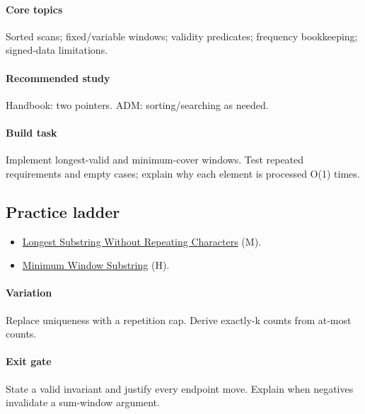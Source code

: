 \documentclass[11pt,letterpaper]{article}
\begin{document}
\paragraph*{Core topics}

Sorted scans; fixed/variable windows; validity predicates; frequency bookkeeping; signed-data limitations.

\paragraph*{Recommended study}

Handbook: two pointers. ADM: sorting/searching as needed.

\paragraph*{Build task}

Implement longest-valid and minimum-cover windows. Test repeated requirements and empty cases; explain why each element is processed O(1) times.

\subsection*{Practice ladder}

\begin{itemize}

\item \href{https://leetcode.com/problems/longest-substring-without-repeating-characters/}{Longest Substring Without Repeating Characters} (M).

\item \href{https://leetcode.com/problems/minimum-window-substring/}{Minimum Window Substring} (H).

\end{itemize}

\paragraph*{Variation}

Replace uniqueness with a repetition cap. Derive exactly-k counts from at-most counts.

\paragraph*{Exit gate}

State a valid invariant and justify every endpoint move. Explain when negatives invalidate a sum-window argument.
\end{document}

